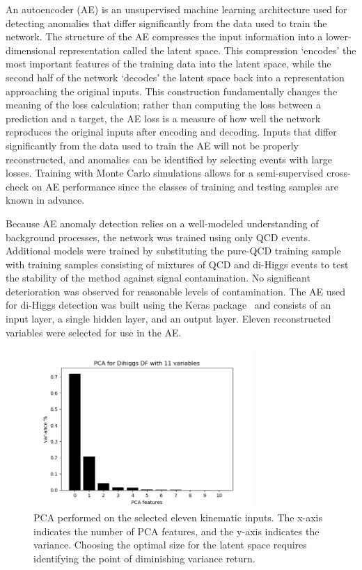 \label{sec:AE}

An autoencoder (AE) is an unsupervised machine learning architecture used for detecting anomalies that differ significantly from the data used to train the network. The structure of the AE compresses the input information into a lower-dimensional representation called the latent space. This compression `encodes' the most important features of the training data into the latent space, while the second half of the network `decodes' the latent space back into a representation approaching the original inputs. This construction fundamentally changes the meaning of the loss calculation; rather than computing the loss between a prediction and a target, the AE loss is a measure of how well the network reproduces the original inputs after encoding and decoding. Inputs that differ significantly from the data used to train the AE will not be properly reconstructed, and anomalies can be identified by selecting events with large losses. Training with Monte Carlo simulations allows for a semi-supervised cross-check on AE performance since the classes of training and testing samples are known in advance.

Because AE anomaly detection relies on a well-modeled understanding of background processes, the network was trained using only QCD events. Additional models were trained by substituting the pure-QCD training sample with training samples consisting of mixtures of QCD and di-Higgs events to test the stability of the method against signal contamination. No significant deterioration was observed for reasonable levels of contamination. The AE used for di-Higgs detection was built using the Keras package~\cite{chollet2015keras} and consists of an input layer, a single hidden layer, and an output layer. Eleven reconstructed variables were selected for use in the AE. 

\begin{figure}[!h] 
\begin{center}
\includegraphics*[width=0.75\textwidth] {AE/figures/ae_PCA_11vars}
\caption{PCA performed on the selected eleven kinematic inputs. The x-axis indicates the number of PCA features, and the y-axis indicates the variance. Choosing the optimal size for the latent space requires identifying the point of diminishing variance return.}
  \label{fig:ae_pca}
\end{center}
\end{figure}

